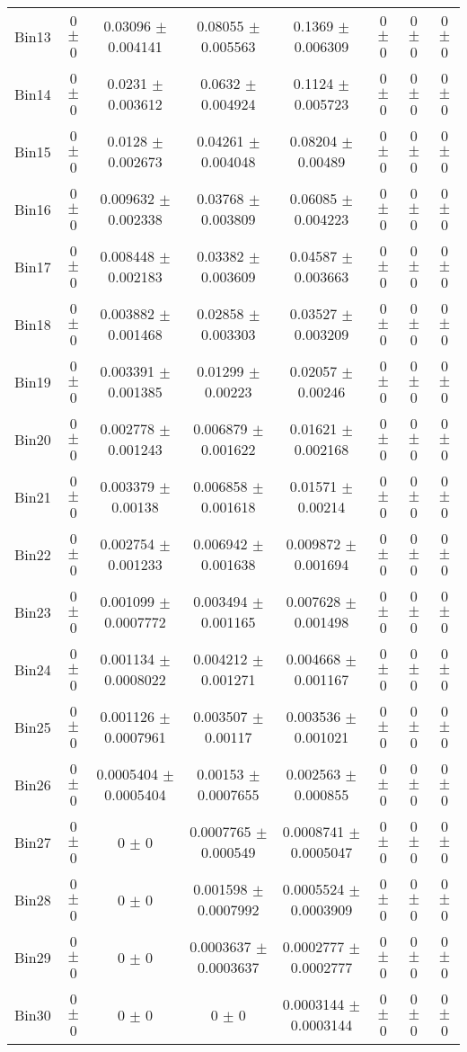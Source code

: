 \begin{tabular}{@{\extracolsep{4pt}}lccccccc@{}}
     Bin13 & 0 $\pm$ 0 & 0.03096 $\pm$ 0.004141 & 0.08055 $\pm$ 0.005563 & 0.1369 $\pm$ 0.006309 & 0 $\pm$ 0 & 0 $\pm$ 0 & 0 $\pm$ 0 \\ 
     Bin14 & 0 $\pm$ 0 & 0.0231 $\pm$ 0.003612 & 0.0632 $\pm$ 0.004924 & 0.1124 $\pm$ 0.005723 & 0 $\pm$ 0 & 0 $\pm$ 0 & 0 $\pm$ 0 \\ 
     Bin15 & 0 $\pm$ 0 & 0.0128 $\pm$ 0.002673 & 0.04261 $\pm$ 0.004048 & 0.08204 $\pm$ 0.00489 & 0 $\pm$ 0 & 0 $\pm$ 0 & 0 $\pm$ 0 \\ 
     Bin16 & 0 $\pm$ 0 & 0.009632 $\pm$ 0.002338 & 0.03768 $\pm$ 0.003809 & 0.06085 $\pm$ 0.004223 & 0 $\pm$ 0 & 0 $\pm$ 0 & 0 $\pm$ 0 \\ 
     Bin17 & 0 $\pm$ 0 & 0.008448 $\pm$ 0.002183 & 0.03382 $\pm$ 0.003609 & 0.04587 $\pm$ 0.003663 & 0 $\pm$ 0 & 0 $\pm$ 0 & 0 $\pm$ 0 \\ 
     Bin18 & 0 $\pm$ 0 & 0.003882 $\pm$ 0.001468 & 0.02858 $\pm$ 0.003303 & 0.03527 $\pm$ 0.003209 & 0 $\pm$ 0 & 0 $\pm$ 0 & 0 $\pm$ 0 \\ 
     Bin19 & 0 $\pm$ 0 & 0.003391 $\pm$ 0.001385 & 0.01299 $\pm$ 0.00223 & 0.02057 $\pm$ 0.00246 & 0 $\pm$ 0 & 0 $\pm$ 0 & 0 $\pm$ 0 \\ 
     Bin20 & 0 $\pm$ 0 & 0.002778 $\pm$ 0.001243 & 0.006879 $\pm$ 0.001622 & 0.01621 $\pm$ 0.002168 & 0 $\pm$ 0 & 0 $\pm$ 0 & 0 $\pm$ 0 \\ 
     Bin21 & 0 $\pm$ 0 & 0.003379 $\pm$ 0.00138 & 0.006858 $\pm$ 0.001618 & 0.01571 $\pm$ 0.00214 & 0 $\pm$ 0 & 0 $\pm$ 0 & 0 $\pm$ 0 \\ 
     Bin22 & 0 $\pm$ 0 & 0.002754 $\pm$ 0.001233 & 0.006942 $\pm$ 0.001638 & 0.009872 $\pm$ 0.001694 & 0 $\pm$ 0 & 0 $\pm$ 0 & 0 $\pm$ 0 \\ 
     Bin23 & 0 $\pm$ 0 & 0.001099 $\pm$ 0.0007772 & 0.003494 $\pm$ 0.001165 & 0.007628 $\pm$ 0.001498 & 0 $\pm$ 0 & 0 $\pm$ 0 & 0 $\pm$ 0 \\ 
     Bin24 & 0 $\pm$ 0 & 0.001134 $\pm$ 0.0008022 & 0.004212 $\pm$ 0.001271 & 0.004668 $\pm$ 0.001167 & 0 $\pm$ 0 & 0 $\pm$ 0 & 0 $\pm$ 0 \\ 
     Bin25 & 0 $\pm$ 0 & 0.001126 $\pm$ 0.0007961 & 0.003507 $\pm$ 0.00117 & 0.003536 $\pm$ 0.001021 & 0 $\pm$ 0 & 0 $\pm$ 0 & 0 $\pm$ 0 \\ 
     Bin26 & 0 $\pm$ 0 & 0.0005404 $\pm$ 0.0005404 & 0.00153 $\pm$ 0.0007655 & 0.002563 $\pm$ 0.000855 & 0 $\pm$ 0 & 0 $\pm$ 0 & 0 $\pm$ 0 \\ 
     Bin27 & 0 $\pm$ 0 & 0 $\pm$ 0 & 0.0007765 $\pm$ 0.000549 & 0.0008741 $\pm$ 0.0005047 & 0 $\pm$ 0 & 0 $\pm$ 0 & 0 $\pm$ 0 \\ 
     Bin28 & 0 $\pm$ 0 & 0 $\pm$ 0 & 0.001598 $\pm$ 0.0007992 & 0.0005524 $\pm$ 0.0003909 & 0 $\pm$ 0 & 0 $\pm$ 0 & 0 $\pm$ 0 \\ 
     Bin29 & 0 $\pm$ 0 & 0 $\pm$ 0 & 0.0003637 $\pm$ 0.0003637 & 0.0002777 $\pm$ 0.0002777 & 0 $\pm$ 0 & 0 $\pm$ 0 & 0 $\pm$ 0 \\ 
     Bin30 & 0 $\pm$ 0 & 0 $\pm$ 0 & 0 $\pm$ 0 & 0.0003144 $\pm$ 0.0003144 & 0 $\pm$ 0 & 0 $\pm$ 0 & 0 $\pm$ 0 \\ 
\hline\hline
  \end{tabular}
